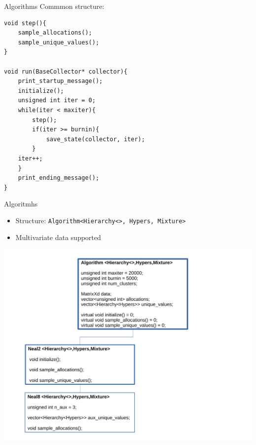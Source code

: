 \begin{frame}[fragile]{Algorithms}
Commmon structure:
\begin{small}
\begin{verbatim}
void step(){
    sample_allocations();
    sample_unique_values();
}

void run(BaseCollector* collector){      
    print_startup_message();
    initialize();
    unsigned int iter = 0;
    while(iter < maxiter){
        step();    
        if(iter >= burnin){
            save_state(collector, iter);
        }
    iter++;
    }
    print_ending_message();
}
\end{verbatim}
\end{small}
\end{frame}

\begin{frame}[fragile]{Algoritmhs} 
\begin{itemize}
	\item Structure: \texttt{Algorithm<Hierarchy<>, Hypers, Mixture>}
	\item Multivariate data supported
\end{itemize}

\begin{center}
	\includegraphics[scale=0.35]{etc/algo.pdf}
\end{center}
\end{frame}


